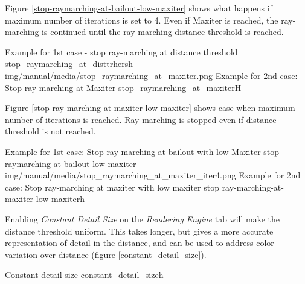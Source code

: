 Figure \ref{stop-raymarching-at-bailout-low-maxiter} shows what happens if maximum number of iterations is set to 4. Even if Maxiter is reached, the
ray-marching is continued until the ray marching distance threshold is reached.

{Example for 1st case - stop ray-marching at distance threshold}
{stop_raymarching_at_disttrhersh}
{img/manual/media/stop_raymarching_at_maxiter.png}
{Example for 2nd case: Stop ray-marching at Maxiter}
{stop_raymarching_at_maxiter}{H}

Figure \ref{stop ray-marching-at-maxiter-low-maxiter} shows case when maximum number of iterations is reached. Ray-marching is stopped even
if distance threshold is not reached.

{Example for 1st case: Stop ray-marching at bailout with low Maxiter}
{stop-raymarching-at-bailout-low-maxiter}
{img/manual/media/stop_raymarching_at_maxiter_iter4.png}
{Example for 2nd case: Stop ray-marching at maxiter with low maxiter}
{stop ray-marching-at-maxiter-low-maxiter}{h}

Enabling \emph{Constant Detail Size} on the \emph{Rendering Engine} tab will make the distance threshold uniform. This takes longer, but gives a more accurate representation of detail in the distance, and can be used to address color variation over distance (figure \ref{constant_detail_size}).

{Constant detail size}
{constant_detail_size}{h}


